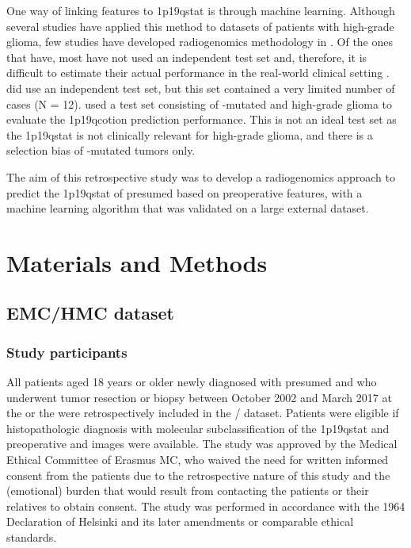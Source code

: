 One way of linking  features to \acl{1p19qstat} is through machine learning.
Although several studies have applied this method to datasets of patients with high-grade glioma, few studies have developed radiogenomics methodology in  \autocite{akkus2017predicting, li2017deep, chang2018deep, han2018non, lu2018machine, zhou2019machine}.
Of the ones that have, most have not used an independent test set and, therefore, it is difficult to estimate their actual performance in the real-world clinical setting \autocite{akkus2017predicting, li2017deep, chang2018deep, han2018non}.
 did use an independent test set, but this set contained a very limited number of  cases (N = 12).
 used a test set consisting of -mutated  and high-grade glioma to evaluate the \acl{1p19qcotion} prediction performance.
This is not an ideal test set as the \acl{1p19qstat} is not clinically relevant for high-grade glioma, and there is a selection bias of -mutated tumors only.

The aim of this retrospective study was to develop a radiogenomics approach to predict the \acl{1p19qstat} of presumed  based on preoperative  features, with a machine learning algorithm that was validated on a large external dataset.

\section{Materials and Methods}
\subsection{\acrshort{EMC}/\acrshort{HMC} dataset}
\subsubsection{Study participants}

All patients aged 18 years or older newly diagnosed with presumed  and who underwent tumor resection or biopsy between October 2002 and March 2017 at the  or the  were retrospectively included in the / dataset.
Patients were eligible if histopathologic diagnosis with molecular subclassification of the \acl{1p19qstat} and preoperative  and   images were available.
The study was approved by the Medical Ethical Committee of Erasmus MC, who waived the need for written informed consent from the patients due to the retrospective nature of this study and the (emotional) burden that would result from contacting the patients or their relatives to obtain consent.
The study was performed in accordance with the 1964 Declaration of Helsinki and its later amendments or comparable ethical standards.

